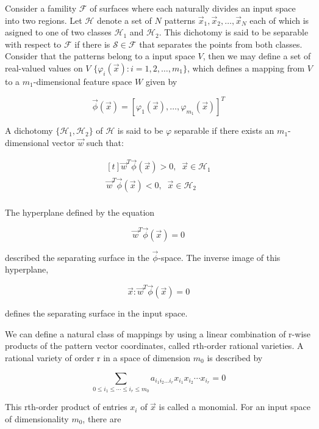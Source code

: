 \documentclass{article}
\begin{document}
Consider a famility \( \mathcal{F} \) of surfaces where each naturally divides an input space into two regions. Let \( \mathcal{H} \) denote a set of $ N $ patterns $ \vec{x}_{1}, \vec{x}_{2}, \ldots, \vec{x}_{N} $ each of which is asigned to one of two classes \( \mathcal{H}_{1} \) and \( \mathcal{H}_{2} \). This dichotomy is said to be separable with respect to \( \mathcal{F} \) if there is $ \mathcal{S} \in \mathcal{F} $ that separates the points from both classes. Consider that the patterns belong to a input space $ V $, then we may define a set of real-valued values on $ V $ $ \{ \varphi_{i} ( \vec{x}) : i = 1, 2, \ldots, m_{1} \} $, which defines a mapping from $ V $ to a $ m_{1} $-dimensional feature space $ W $ given by

$$ \vec{\phi} ( \vec{x}) = [ \varphi_{1} ( \vec{x}), \ldots, \varphi_{m_{1}} ( \vec{x})]^{T} $$

A dichotomy $ \{ \mathcal{H}_{1}, \mathcal{H}_{2} \} $ of $ \mathcal{H} $ is said to be $ \varphi $ separable if there exists an $ m_{1} $-dimensional vector $ \vec{w} $ such that:

$$ \begin{aligned}[t]
	\vec{w}^{T} \vec{\phi} ( \vec{x}) > 0, \;\; \vec{x} \in \mathcal{H}_{1} \\
	\vec{w}^{T} \vec{\phi} ( \vec{x}) < 0, \;\; \vec{x} \in \mathcal{H}_{2} \\
\end{aligned} $$

The hyperplane defined by the equation

$$ \vec{w}^{T} \vec{\phi} ( \vec{x}) = 0 $$

\noindent described the separating surface in the $ \vec{\phi} $-space. The inverse image of this hyperplane,

$$ \vec{x}: \vec{w}^{T} \vec{\phi} ( \vec{x}) = 0 $$

\noindent defines the separating surface in the input space.

We can define a natural class of mappings by using a linear combination of r-wise products of the pattern vector coordinates, called rth-order rational varieties. A rational variety of order r in a space of dimension $ m_{0} $ is described by

$$ \sum_{0 \leq i_{1} \leq \cdots \leq i_{r} \leq m_{0}} a_{i_{1}i_{2}\ldots i_{r}}x_{i_{1}}x_{i_{2}}\cdots x_{i_{r}} = 0 $$

This rth-order product of entries $ x_{i} $ of $ \vec{x} $ is called a monomial. For an input space of dimensionality $ m_{0} $, there are
\end{document}
